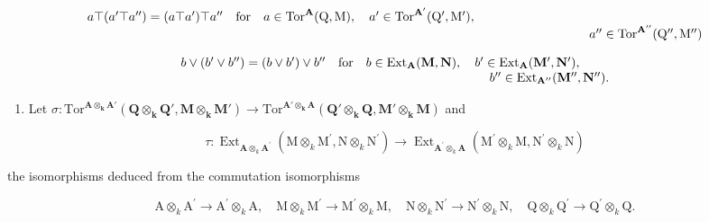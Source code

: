 \[
\begin{array}{l l} a \top (a ^ {\prime} \top a ^ {\prime \prime}) = (a \top a ^ {\prime}) \top a ^ {\prime \prime} & \text {for} \quad a \in \operatorname{Tor} ^ {\mathbf {A}} (\mathrm{Q}, \mathrm{M}), \quad a ^ {\prime} \in \operatorname{Tor} ^ {\mathbf {A} ^ {\prime}} (\mathrm{Q} ^ {\prime}, \mathrm{M} ^ {\prime}), \\ & \qquad \qquad \qquad \qquad \qquad \qquad \qquad \qquad \qquad \qquad \qquad \qquad \qquad \qquad a ^ {\prime \prime} \in \operatorname{Tor} ^ {\mathbf {A} ^ {\prime \prime}} (\mathrm{Q} ^ {\prime \prime}, \mathrm{M} ^ {\prime \prime}) \end{array}
\]

\[
\begin{array}{r l} b \vee (b ^ {\prime} \vee b ^ {\prime \prime}) = (b \vee b ^ {\prime}) \vee b ^ {\prime \prime} & \text {for} \quad b \in \operatorname{Ext} _ {\mathbf {A}} (\mathbf {M}, \mathbf {N}), \quad b ^ {\prime} \in \operatorname{Ext} _ {\mathbf {A}} (\mathbf {M} ^ {\prime}, \mathbf {N} ^ {\prime}), \\ & \qquad \qquad \qquad \qquad \qquad \qquad b ^ {\prime \prime} \in \operatorname{Ext} _ {\mathbf {A} ^ {\prime \prime}} (\mathbf {M} ^ {\prime \prime}, \mathbf {N} ^ {\prime \prime}). \end{array}
\]

\begin{enumerate}
\def\labelenumi{\alph{enumi})}
\setcounter{enumi}{3}
\tightlist
\item
  Let \(\sigma : \mathrm{Tor}^{\mathbf{A} \otimes_{\mathbf{k}} \mathbf{A}'}(\mathbf{Q} \otimes_{\mathbf{k}} \mathbf{Q}', \mathbf{M} \otimes_{\mathbf{k}} \mathbf{M}') \to \mathrm{Tor}^{\mathbf{A}' \otimes_{\mathbf{k}} \mathbf{A}}(\mathbf{Q}' \otimes_{\mathbf{k}} \mathbf{Q}, \mathbf{M}' \otimes_{\mathbf{k}} \mathbf{M})\) and
\end{enumerate}

\[
\tau : \operatorname{Ext} _ {\mathbf {A} \otimes_ {k} \mathbf {A} ^ {\prime}} (\mathrm{M} \otimes_ {k} \mathrm{M} ^ {\prime}, \mathrm{N} \otimes_ {k} \mathrm{N} ^ {\prime}) \rightarrow \operatorname{Ext} _ {\mathbf {A} ^ {\prime} \otimes_ {k} \mathbf {A}} (\mathrm{M} ^ {\prime} \otimes_ {k} \mathrm{M}, \mathrm{N} ^ {\prime} \otimes_ {k} \mathrm{N})
\]

the isomorphisms deduced from the commutation isomorphisms

\[
\mathrm{A} \otimes_ {k} \mathrm{A} ^ {\prime} \rightarrow \mathrm{A} ^ {\prime} \otimes_ {k} \mathrm{A}, \quad \mathrm{M} \otimes_ {k} \mathrm{M} ^ {\prime} \rightarrow \mathrm{M} ^ {\prime} \otimes_ {k} \mathrm{M}, \quad \mathrm{N} \otimes_ {k} \mathrm{N} ^ {\prime} \rightarrow \mathrm{N} ^ {\prime} \otimes_ {k} \mathrm{N}, \quad \mathrm{Q} \otimes_ {k} \mathrm{Q} ^ {\prime} \rightarrow \mathrm{Q} ^ {\prime} \otimes_ {k} \mathrm{Q}.
\]

